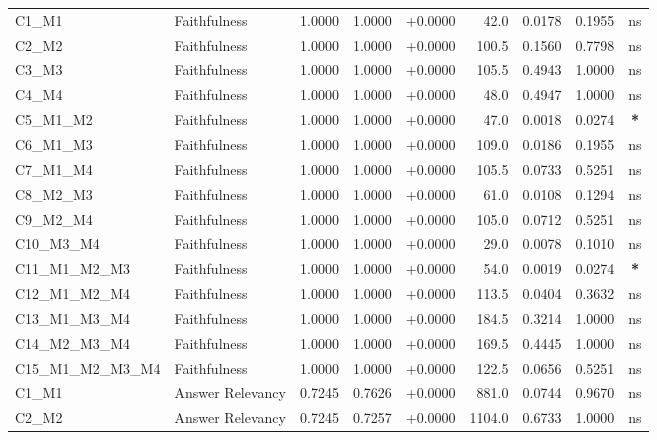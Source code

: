 \begin{table}[p]
\begin{tabular*}{\textwidth}{@{\extracolsep{\fill}} l l r r r r r r c @{}}
\addlinespace
C1\_M1          & Faithfulness         & 1.0000 & 1.0000 & +0.0000 & 42.0 & 0.0178 & 0.1955 & ns \\
\addlinespace
C2\_M2          & Faithfulness         & 1.0000 & 1.0000 & +0.0000 & 100.5 & 0.1560 & 0.7798 & ns \\
\addlinespace
C3\_M3          & Faithfulness         & 1.0000 & 1.0000 & +0.0000 & 105.5 & 0.4943 & 1.0000 & ns \\
\addlinespace
C4\_M4          & Faithfulness         & 1.0000 & 1.0000 & +0.0000 & 48.0 & 0.4947 & 1.0000 & ns \\
\addlinespace
C5\_M1\_M2      & Faithfulness         & 1.0000 & 1.0000 & +0.0000 & 47.0 & 0.0018 & 0.0274 & \textbf{*} \\
\addlinespace
C6\_M1\_M3      & Faithfulness         & 1.0000 & 1.0000 & +0.0000 & 109.0 & 0.0186 & 0.1955 & ns \\
\addlinespace
C7\_M1\_M4      & Faithfulness         & 1.0000 & 1.0000 & +0.0000 & 105.5 & 0.0733 & 0.5251 & ns \\
\addlinespace
C8\_M2\_M3      & Faithfulness         & 1.0000 & 1.0000 & +0.0000 & 61.0 & 0.0108 & 0.1294 & ns \\
\addlinespace
C9\_M2\_M4      & Faithfulness         & 1.0000 & 1.0000 & +0.0000 & 105.0 & 0.0712 & 0.5251 & ns \\
\addlinespace
C10\_M3\_M4     & Faithfulness         & 1.0000 & 1.0000 & +0.0000 & 29.0 & 0.0078 & 0.1010 & ns \\
\addlinespace
C11\_M1\_M2\_M3 & Faithfulness         & 1.0000 & 1.0000 & +0.0000 & 54.0 & 0.0019 & 0.0274 & \textbf{*} \\
\addlinespace
C12\_M1\_M2\_M4 & Faithfulness         & 1.0000 & 1.0000 & +0.0000 & 113.5 & 0.0404 & 0.3632 & ns \\
\addlinespace
C13\_M1\_M3\_M4 & Faithfulness         & 1.0000 & 1.0000 & +0.0000 & 184.5 & 0.3214 & 1.0000 & ns \\
\addlinespace
C14\_M2\_M3\_M4 & Faithfulness         & 1.0000 & 1.0000 & +0.0000 & 169.5 & 0.4445 & 1.0000 & ns \\
\addlinespace
C15\_M1\_M2\_M3\_M4 & Faithfulness         & 1.0000 & 1.0000 & +0.0000 & 122.5 & 0.0656 & 0.5251 & ns \\
\addlinespace
C1\_M1          & Answer Relevancy     & 0.7245 & 0.7626 & +0.0000 & 881.0 & 0.0744 & 0.9670 & ns \\
\addlinespace
C2\_M2          & Answer Relevancy     & 0.7245 & 0.7257 & +0.0000 & 1104.0 & 0.6733 & 1.0000 & ns \\

\end{tabular*}
\end{table}
